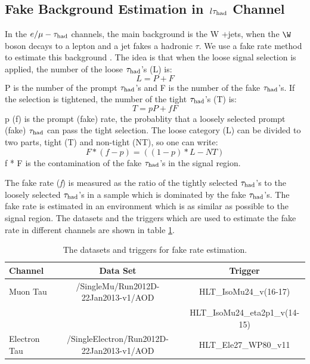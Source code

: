 \subsection{\texorpdfstring{Fake Background Estimation in $\,l\tau_{\rm had}$ Channel}{Fake Background Estimation in lepton-tau Channel}}
\label{sect:bkgLeptau}
In the $e/\mu-\tau_{\rm had}$ channels, the main background is the W +jets, when the $\W$ boson decays to a lepton and a jet fakes a hadronic $\tau$.
We use a fake rate method to estimate this background \cite{CMS_AN_2010-261}. 
The idea is that when the loose signal selection is applied, the number of the loose $\tau_{\rm had}$'s (L) is:
\begin{equation}
L = P + F
\end{equation}
P is the number of the  prompt $\tau_{\rm had}$'s and F is the number of the  fake $\tau_{\rm had}$'s. If the selection is tightened, the number of the tight $\tau_{\rm had}$'s (T) is:
\begin{equation}
 T = pP + fF
\end{equation} 
p (f) is the prompt (fake) rate, the probablity that a loosely selected prompt (fake) $\tau_{\rm had}$ can pass the  tight  selection. The loose category (L) can be divided to two parts, 
tight (T) and non-tight (NT), so one can write:
\begin{equation}
   F * (f - p) = ((1 - p) * L - NT)
\end{equation}
f * F is the contamination of the fake $\tau_{\rm had}$'s in the signal region. 

The fake rate ({\it f}) is measured as the ratio of the tightly selected $\tau_{\rm had}$'s to the loosely 
selected $\tau_{\rm had}$'s in a sample which is dominated by the fake $\tau_{\rm had}$'s. The fake rate is estimated in an environment which is as similar as possible to 
the signal region. The datasets and the triggers which are used to estimate the fake rate in different channels are shown in 
table \ref{Tab.DataFR}.
\begin{table}[!htb]
\begin{center}
\caption{The datasets and triggers for fake rate estimation.}
\label{Tab.DataFR}
\begin{tabular}{|l|c|c|}
\hline
Channel      & Data Set                                     & Trigger \\\hline
Muon Tau     & /SingleMu/Run2012D-22Jan2013-v1/AOD          & HLT\_IsoMu24\_v(16-17)\\
             &                                              & HLT\_IsoMu24\_eta2p1\_v(14-15)\\\hline
Electron Tau & /SingleElectron/Run2012D-22Jan2013-v1/AOD    & HLT\_Ele27\_WP80\_v11\\
\hline
\end{tabular}
\end{center}
\end{table}

